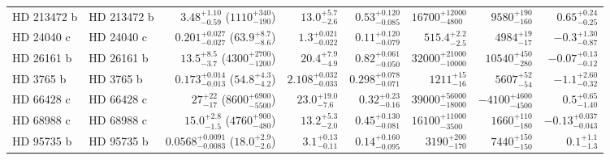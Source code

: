 \begin{longtable*}{llrrrrrr}
HD 213472 b & HD 213472 b & $3.48^{+1.10}_{-0.59}$ ($1110^{+340}_{-190}$) & $13.0^{+5.7}_{-2.6}$ & $0.53^{+0.120}_{-0.085}$ & $16700^{+12000}_{-4800}$ & $9580^{+190}_{-160}$ & $0.65^{+0.24}_{-0.25}$ \\ 
HD 24040 c & HD 24040 c & $0.201^{+0.027}_{-0.027}$ ($63.9^{+8.7}_{-8.6}$) & $1.3^{+0.021}_{-0.022}$ & $0.11^{+0.120}_{-0.079}$ & $515.4^{+2.2}_{-2.5}$ & $4984^{+19}_{-17}$ & $-0.3^{+1.30}_{-0.87}$ \\ 
HD 26161 b & HD 26161 b & $13.5^{+8.5}_{-3.7}$ ($4300^{+2700}_{-1200}$) & $20.4^{+7.9}_{-4.9}$ & $0.82^{+0.061}_{-0.050}$ & $32000^{+21000}_{-10000}$ & $10540^{+450}_{-280}$ & $-0.07^{+0.13}_{-0.12}$ \\ 
HD 3765 b & HD 3765 b & $0.173^{+0.014}_{-0.013}$ ($54.8^{+4.3}_{-4.2}$) & $2.108^{+0.032}_{-0.033}$ & $0.298^{+0.078}_{-0.071}$ & $1211^{+15}_{-16}$ & $5607^{+52}_{-54}$ & $-1.1^{+2.60}_{-0.32}$ \\ 
HD 66428 c & HD 66428 c & $27^{+22}_{-17}$ ($8600^{+6900}_{-5500}$) & $23.0^{+19.0}_{-7.6}$ & $0.32^{+0.23}_{-0.16}$ & $39000^{+56000}_{-18000}$ & $-4100^{+4600}_{-4500}$ & $0.5^{+0.65}_{-1.40}$ \\ 
HD 68988 c & HD 68988 c & $15.0^{+2.8}_{-1.5}$ ($4760^{+900}_{-480}$) & $13.2^{+5.3}_{-2.0}$ & $0.45^{+0.130}_{-0.081}$ & $16100^{+11000}_{-3500}$ & $1660^{+110}_{-180}$ & $-0.13^{+0.037}_{-0.043}$ \\ 
HD 95735 b & HD 95735 b & $0.0568^{+0.0091}_{-0.0083}$ ($18.0^{+2.9}_{-2.6}$) & $3.1^{+0.13}_{-0.11}$ & $0.14^{+0.160}_{-0.095}$ & $3190^{+200}_{-170}$ & $7440^{+150}_{-150}$ & $0.1^{+1.1}_{-1.3}$ \\ 
\bottomrule 
\end{longtable*} 
